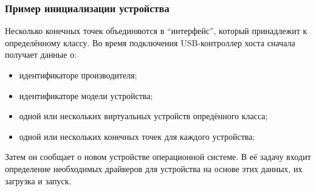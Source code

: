 \documentclass[a4paper,12pt]{report}
\numberwithin{equation}{section}
\begin{document}
\subsubsection{Пример инициализации устройства}
Несколько конечных точек объединяются в ``интерфейс'', который принадлежит к
определённому классу. Во время подключения USB-контроллер хоста сначала получает
данные о:
\begin{itemize}
\item идентификаторе производителя;
\item идентификаторе модели устройства;
\item одной или нескольких виртуальных устройств опредённого класса;
\item одной или нескольких конечных точек для каждого устройства;
\end{itemize}
Затем он сообщает о новом устройстве операционной системе. В её задачу входит
определение необходимых драйверов для устройства на основе этих данных, их
загрузка и запуск.
\end{document}
